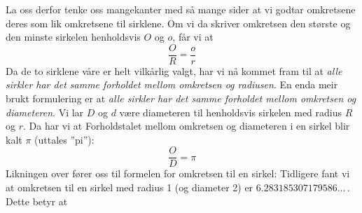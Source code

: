 {La oss derfor tenke oss mangekanter med så mange sider at vi godtar omkretsene deres som lik omkretsene til sirklene. Om vi da skriver omkretsen den største og den minste sirkelen henholdsvis $ O $ og $ o $, får vi at \vs
\[ \frac{O}{R}=\frac{o}{r} \]
Da de to sirklene våre er helt vilkårlig valgt, har vi nå kommet fram til at \textit{alle sirkler har det samme forholdet mellom omkretsen og radiusen}. En enda meir brukt formulering er at \textit{alle sirkler har det samme forholdet mellom omkretsen og diameteren}. Vi lar $ D $ og $ d $ være diameteren til henholdsvis sirkelen med radius $ R $ og $ r $. Da har vi at
Forholdstalet mellom omkretsen og diameteren i en sirkel blir kalt $ \pi $ \index{$ \pi $}(uttales ''pi''):
\[ \frac{O}{D}=\pi \]
Likningen over fører oss til formelen for omkretsen til en sirkel:
Tidligere fant vi at omkretsen til en sirkel med radius 1 (og diameter 2) er $ 6.283185307179586... $\,. Dette betyr at
} \vsk

\vsk


